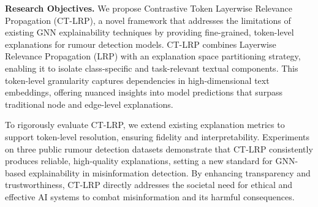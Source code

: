 \textbf{Research Objectives.} We propose Contrastive Token Layerwise Relevance Propagation (CT-LRP), a novel framework that addresses the limitations of existing GNN explainability techniques by providing fine-grained, token-level explanations for rumour detection models. CT-LRP combines Layerwise Relevance Propagation (LRP) with an explanation space partitioning strategy, enabling it to isolate class-specific and task-relevant textual components. This token-level granularity captures dependencies in high-dimensional text embeddings, offering nuanced insights into model predictions that surpass traditional node and edge-level explanations.

To rigorously evaluate CT-LRP, we extend existing explanation metrics to support token-level resolution, ensuring fidelity and interpretability. Experiments on three public rumour detection datasets demonstrate that CT-LRP consistently produces reliable, high-quality explanations, setting a new standard for GNN-based explainability in misinformation detection. By enhancing transparency and trustworthiness, CT-LRP directly addresses the societal need for ethical and effective AI systems to combat misinformation and its harmful consequences.


